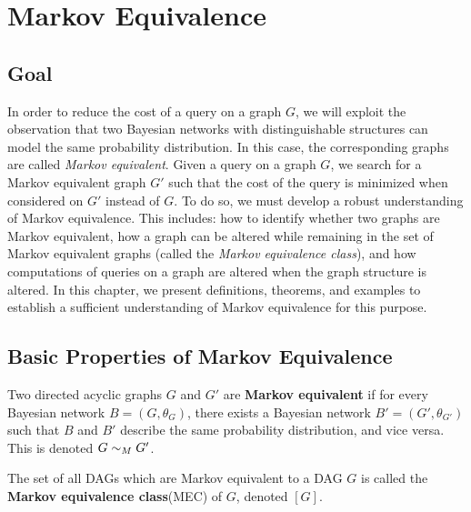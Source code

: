 \chapter{Markov Equivalence}



\section{Goal}

\null \quad \quad In order to reduce the cost of a query on a graph $G$, we will exploit the observation that two Bayesian networks with distinguishable structures can model the same probability distribution. In this case, the corresponding graphs are called \textit{Markov equivalent}. Given a query on a graph $G$, we search for a Markov equivalent graph $G'$ such that the cost of the query is minimized when considered on $G'$ instead of $G$.  \newline
\null \quad \quad To do so, we must develop a robust understanding of Markov equivalence. This includes: how to identify whether two graphs are Markov equivalent, how a graph can be altered while remaining in the set of Markov equivalent graphs (called the \textit{Markov equivalence class}), and how computations of queries on a graph are altered when the graph structure is altered. \newline
\null \quad \quad In this chapter, we present definitions, theorems, and examples to establish a sufficient understanding of Markov equivalence for this purpose. 

\section{Basic Properties of Markov Equivalence}

\begin{definition}
Two directed acyclic graphs $G$ and $G'$ are \textbf{Markov equivalent} if for every Bayesian network $B = (G, \theta_{G})$, there exists a Bayesian network $B' = (G', \theta_{G'})$ such that $B$ and $B'$ describe the same probability distribution, and vice versa. This is denoted $G \sim_{M} G'$.
\end{definition}
\newpage

\begin{definition}
The set of all DAGs which are Markov equivalent to a DAG $G$ is called the \textbf{Markov equivalence class}(MEC) of $G$, denoted $[G]$.
\end{definition}

